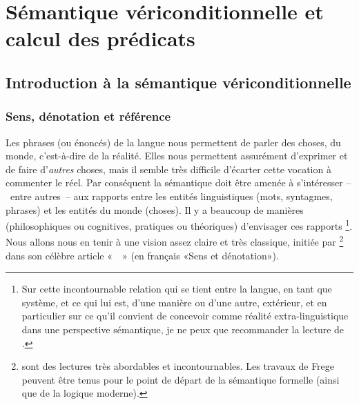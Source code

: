 \chapter{Sémantique vériconditionnelle et calcul des prédicats}
\label{LCP}




\section{Introduction à la sémantique vériconditionnelle}

\subsection{Sens,  dénotation et référence}
\label{ss:SuB}

Les phrases (ou énoncés) de la langue nous permettent de parler des
choses, du monde, c'est-à-dire de la réalité.  Elles nous permettent
assurément d'exprimer et de faire d'\emph{autres} choses, mais il semble
très difficile d'écarter cette vocation à commenter le réel.
Par conséquent  la sémantique doit être amenée à s'intéresser --~entre
autres~-- aux 
rapports entre les entités linguistiques (mots, syntagmes, phrases) et
les entités du monde (choses).  Il y a beaucoup de manières
(philosophiques ou cognitives, pratiques ou théoriques) d'envisager ces
rapports%
\footnote{Sur cette  incontournable relation 
qui se tient entre la
langue, en tant que système, et ce qui lui est, d'une manière ou d'une
autre, extérieur,
et en particulier sur ce qu'il convient de concevoir
comme réalité extra-linguistique dans une perspective sémantique, je
ne peux que recommander la lecture de
\citet[chap.~1]{Kleiber:99}.}.
%
 Nous allons nous en tenir
à une vision assez claire et très classique, initiée par
\textcite{Frege:SuB}%
\footnote{\citet{Frege:SuB,Frege:COfr} sont des
  lectures très abordables et incontournables. Les travaux de Frege
  peuvent être tenus pour le point de départ de la sémantique formelle
  (ainsi que de la logique moderne).} %
dans son célèbre article «~~»
  (en français «Sens et dénotation»).


